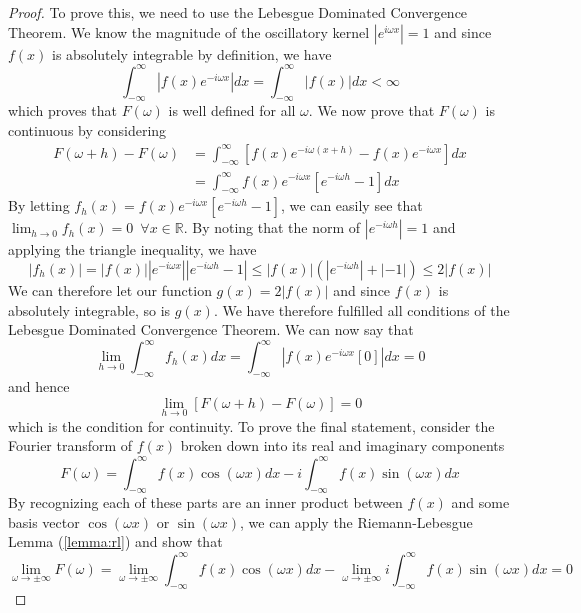 \documentclass{report}
\theoremstyle{definition}
\theoremstyle{remark}
\newcommand{\R}{\mathbb{R}}
\begin{document}
\begin{proof}
    To prove this, we need to use the Lebesgue Dominated Convergence Theorem. We know the magnitude of the oscillatory kernel $|e^{i\omega x}|=1$ and since $f(x)$ is absolutely integrable by definition, we have
    \begin{equation*}
        \int^\infty_{-\infty}|f(x)e^{-i\omega x}|dx = \int^\infty_{-\infty}|f(x)|dx < \infty
    \end{equation*}
    which proves that $F(\omega)$ is well defined for all $\omega$. We now prove that $F(\omega)$ is continuous by considering 
    \begin{equation*}
        \begin{split}
            F(\omega+h)-F(\omega)&=\int^\infty_{-\infty} [f(x)e^{-i\omega (x+h)}-f(x)e^{-i\omega x}]dx\\
            &=\int^\infty_{-\infty} f(x)e^{-i\omega x}[e^{-i\omega h}-1]dx
        \end{split}
    \end{equation*}
    By letting $f_h(x)=f(x)e^{-i\omega x}[e^{-i\omega h}-1]$, we can easily see that $\lim_{h\rightarrow 0}f_h(x) =0 \,\,\, \forall x\in \R$. By noting that the norm of $|e^{-i\omega h}|=1$ and applying the triangle inequality, we have 
    \begin{equation*}
        |f_h(x)|=|f(x)||e^{-i\omega x}||e^{-i\omega h}-1|\leq|f(x)|(|e^{-i\omega h}|+|-1|) \leq 2|f(x)|
    \end{equation*}
    We can therefore let our function $g(x)=2|f(x)|$ and since $f(x)$ is absolutely integrable, so is $g(x)$. We have therefore fulfilled all conditions of the Lebesgue Dominated Convergence Theorem. We can now say that 
    \begin{equation*}
        \lim_{h\rightarrow 0}\int^\infty_{-\infty}f_h(x)dx = \int^\infty_{-\infty}|f(x)e^{-i\omega x}[0]|dx = 0
    \end{equation*}
    and hence 
    \begin{equation*}
        \lim_{h\rightarrow 0}[F(\omega +h)-F(\omega)] =0
    \end{equation*}
    which is the condition for continuity. To prove the final statement, consider the Fourier transform of $f(x)$ broken down into its real and imaginary components 
    \begin{equation*}
        F(\omega) = \int^\infty_{-\infty}f(x)\cos(\omega x)dx - i\int^\infty_{-\infty}f(x)\sin(\omega x)dx
    \end{equation*}
    By recognizing each of these parts are an inner product between $f(x)$ and some basis vector $\cos(\omega x)$ or $\sin(\omega x)$, we can apply the Riemann-Lebesgue Lemma (\ref{lemma:rl}) and show that 
    \begin{equation*}
        \lim_{\omega\rightarrow \pm \infty}F(\omega) =\lim_{\omega\rightarrow \pm \infty}\int^\infty_{-\infty}f(x)\cos(\omega x)dx - \lim_{\omega\rightarrow \pm \infty}i\int^\infty_{-\infty}f(x)\sin(\omega x)dx = 0
    \end{equation*}
    
\end{proof}
\end{document}
